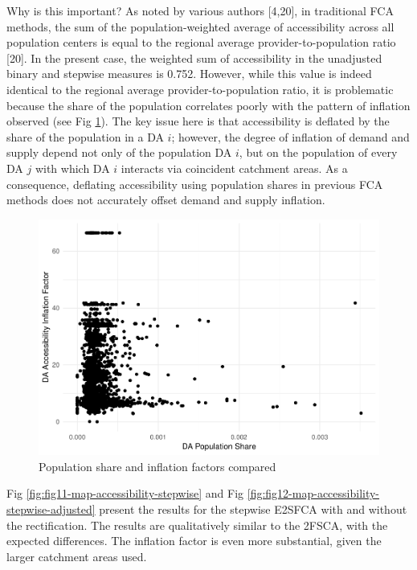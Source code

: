 \documentclass[10pt,letterpaper]{article}
\begin{document}
Why is this important? As noted by various authors {[}4,20{]}, in
traditional FCA methods, the sum of the population-weighted average of
accessibility across all population centers is equal to the regional
average provider-to-population ratio {[}20{]}. In the present case, the
weighted sum of accessibility in the unadjusted binary and stepwise
measures is 0.752. However, while this value is indeed identical to the
regional average provider-to-population ratio, it is problematic because
the share of the population correlates poorly with the pattern of
inflation observed (see Fig
\ref{fig:fig10-map-pop-share-inflation-comparison-binary}). The key
issue here is that accessibility is deflated by the share of the
population in a DA \(i\); however, the degree of inflation of demand and
supply depend not only of the population DA \(i\), but on the population
of every DA \(j\) with which DA \(i\) interacts via coincident catchment
areas. As a consequence, deflating accessibility using population shares
in previous FCA methods does not accurately offset demand and supply
inflation.

\begin{figure}
\centering
\includegraphics{Supply_and_Demand_Inflation_in_FCA_Methods_v2.0_files/figure-latex/fig10-map-pop-share-inflation-comparison-binary-1.pdf}
\caption{\label{fig:fig10-map-pop-share-inflation-comparison-binary}Population
share and inflation factors compared}
\end{figure}

Fig \ref{fig:fig11-map-accessibility-stepwise} and Fig
\ref{fig:fig12-map-accessibility-stepwise-adjusted} present the results
for the stepwise E2SFCA with and without the rectification. The results
are qualitatively similar to the 2FSCA, with the expected differences.
The inflation factor is even more substantial, given the larger
catchment areas used.
\end{document}
